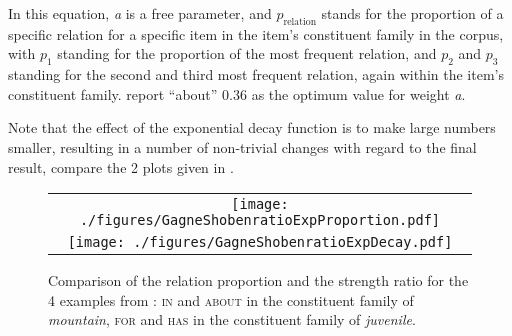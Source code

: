 In this equation, \emph{a} is a free parameter, and
$p_{\text{relation}}$ stands for the proportion of a specific
relation for a specific item in the item's constituent family in the corpus, with $p_1$ standing for
the proportion of the most frequent relation, and $p_2$ and $p_3$ standing
for the second and third most frequent relation, again within the
item's constituent family. \citet[81]{GagneandShoben:1997} report
``about'' 0.36 as the optimum value for weight \emph{a}.

\enlargethispage{1\baselineskip}
Note that the effect of the exponential decay function is to make
large numbers smaller, resulting in a number of non-trivial changes
with regard to the final result, compare the 2 plots given in
.


\begin{figure}[!htb]
  \centering
  \begin{tabular}{c}
    \texttt{[image: ./figures/GagneShobenratioExpProportion.pdf]}\\
    \texttt{[image: ./figures/GagneShobenratioExpDecay.pdf]}
  \end{tabular}

  \caption{Comparison of the relation proportion and the strength ratio for the 4 examples from \citet{GagneandShoben:1997}: \textsc{in} and \textsc{about} in the constituent family of \emph{mountain}, \textsc{for} and \textsc{has} in the constituent family of \emph{juvenile}.}
\label{fig:GagneShobenRatioExp}  
\end{figure}

